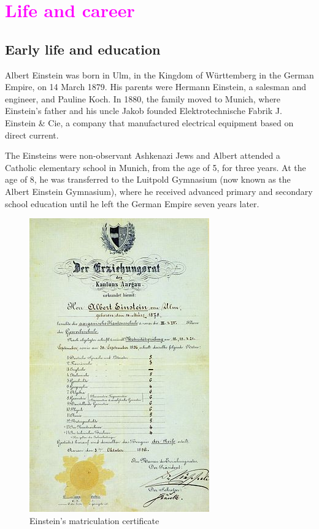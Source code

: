 \documentclass{article}
\begin{document}
\section{\textcolor{magenta}{Life and career}}
\subsection{Early life and education}
Albert Einstein was born in Ulm, in the Kingdom of Württemberg in the German Empire, on 14 March 1879. His parents were Hermann Einstein, a salesman and engineer, and Pauline Koch. In 1880, the family moved to Munich, where Einstein's father and his uncle Jakob founded Elektrotechnische Fabrik J. Einstein \& Cie, a company that manufactured electrical equipment based on direct current.


The Einsteins were non-observant Ashkenazi Jews and Albert attended a Catholic elementary school in Munich, from the age of 5, for three years. At the age of 8, he was transferred to the Luitpold Gymnasium (now known as the Albert Einstein Gymnasium), where he received advanced primary and secondary school education until he left the German Empire seven years later.


\begin{figure}
\vspace{-10pt}

\begin{center}
\includegraphics[width=.40\textwidth]{figures/Albert_Einstein's_exam_of_maturity_grades_(color2).jpg}
\end{center}

\vspace{-10pt}
\caption{Einstein's matriculation certificate}
\vspace{-10pt}
\label{fig:matriculation_certificate}
\end{figure}
\end{document}
